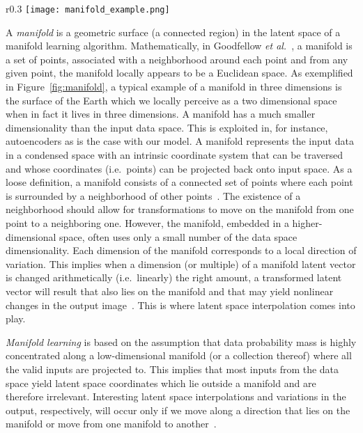 \documentclass[a4paper,12pt]{report}
\begin{document}
\begin{wrapfigure}{r}{0.3\textwidth}
\centering
\texttt{[image: manifold\_example.png]} 
\caption{Examples of manifolds \cite{Manifold}.}
\label{fig:manifold}
\end{wrapfigure}
A \textit{manifold} is a geometric surface (a connected region) in the latent space of a manifold learning algorithm. Mathematically, in Goodfellow \textit{et al.}~\cite{DeepLearningBook}, a manifold is a set of points, associated with a neighborhood around each point and from any given point, the manifold locally appears to be a Euclidean space. As exemplified in Figure~\ref{fig:manifold}, a typical example of a manifold in three dimensions is the surface of the Earth which we locally perceive as a two dimensional space when in fact it lives in three dimensions. A manifold has a much smaller dimensionality than the input data space. This is exploited in, for instance, autoencoders as is the case with our model. A manifold represents the input data in a condensed space with an intrinsic coordinate system that can be traversed and whose coordinates (i.e.\ points) can be projected back onto input space. As a loose definition, a manifold consists of a connected set of points where each point is surrounded by a neighborhood of other points~\cite{DeepLearningBook}. The existence of a neighborhood should allow for transformations to move on the manifold from one point to a neighboring one. However, the manifold, embedded in a higher-dimensional space, often uses only a small number of the data space dimensionality. Each dimension of the manifold corresponds to a local direction of variation. This implies when a dimension (or multiple) of a manifold latent vector is changed arithmetically (i.e.\ linearly) the right amount, a transformed latent vector will result that also lies on the manifold and that may yield nonlinear changes in the output image~\cite{StyleGAN}. This is where latent space interpolation comes into play. 

\textit{Manifold learning} is based on the assumption that data probability mass is highly concentrated along a low-dimensional manifold (or a collection thereof) where all the valid inputs are projected to. This implies that most inputs from the data space yield latent space coordinates which lie outside a manifold and are therefore irrelevant. Interesting latent space interpolations and variations in the output, respectively, will occur only if we move along a direction that lies on the manifold or move from one manifold to another~\cite{DeepLearningBook}.
\end{document}
